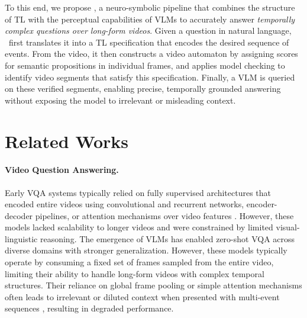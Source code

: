 \documentclass[letterpaper]{article} %
\begin{document}
    To this end, we propose \nsvqa, a neuro-symbolic pipeline that combines the structure of TL with the perceptual capabilities of VLMs to accurately answer \textit{temporally complex questions over long-form videos}. Given a question in natural language, \nsvqa\ first translates it into a TL specification that encodes the desired sequence of events. From the video, it then constructs a video automaton by assigning scores for semantic propositions in individual frames, and applies model checking to identify video segments that satisfy this specification. Finally, a VLM is queried on these verified segments, enabling precise, temporally grounded answering without exposing the model to irrelevant or misleading context.




\section{Related Works}
\label{sec:related-works}
    
    \paragraph{Video Question Answering.}
        
    Early VQA systems \citep{antol2015vqa} typically relied on fully supervised architectures that encoded entire videos using convolutional and recurrent networks, encoder-decoder pipelines, or attention mechanisms over video features \citep{zhu2016visual7w, ye2017video, jang2017tgif}. However, these models lacked scalability to longer videos and were constrained by limited visual-linguistic reasoning. The emergence of VLMs \citep{bai2025qwen2, internvl2024v2, achiam2023gpt, li2024llava, li2024aria} has enabled zero-shot VQA across diverse domains with stronger generalization. However, these models typically operate by consuming a fixed set of frames sampled from the entire video, limiting their ability to handle long-form videos with complex temporal structures. Their reliance on global frame pooling or simple attention mechanisms often leads to irrelevant or diluted context when presented with multi-event sequences \citep{wu2024longvideobench, wang2024lvbench}, resulting in degraded performance.
    
\end{document}
